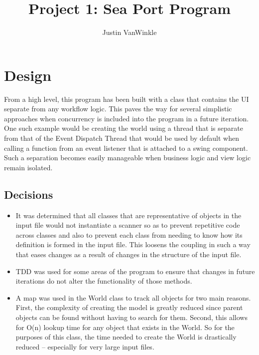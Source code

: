 \documentclass[english,floatsintext,man]{apa6}
\title{Project 1: Sea Port Program}
\author{Justin VanWinkle}
\affiliation{
    \vspace{0.5cm}
          \textsuperscript{} 26 March 2017\\
          \textsuperscript{} CMSC 335 (7980)  }
\providecommand{\tightlist}{%
  \setlength{\itemsep}{0pt}\setlength{\parskip}{0pt}}
\begin{document}
\maketitle

\setcounter{secnumdepth}{0}



\section{Design}\label{design}

From a high level, this program has been built with a class that
contains the UI separate from any workflow logic. This paves the way for
several simplistic approaches when concurrency is included into the
program in a future iteration. One such example would be creating the
world using a thread that is separate from that of the Event Dispatch
Thread that would be used by default when calling a function from an
event listener that is attached to a swing component. Such a separation
becomes easily manageable when business logic and view logic remain
isolated.

\subsection{Decisions}\label{decisions}

\begin{itemize}
\tightlist
\item
  It was determined that all classes that are representative of objects
  in the input file would not instantiate a scanner so as to prevent
  repetitive code across classes and also to prevent each class from
  needing to know how its definition is formed in the input file. This
  loosens the coupling in such a way that eases changes as a result of
  changes in the structure of the input file.
\item
  TDD was used for some areas of the program to ensure that changes in
  future iterations do not alter the functionality of those methods.
\item
  A map was used in the World class to track all objects for two main
  reasons. First, the complexity of creating the model is greatly
  reduced since parent objects can be found without having to search for
  them. Second, this allows for O(n) lookup time for any object that
  exists in the World. So for the purposes of this class, the time
  needed to create the World is drastically reduced -- especially for
  very large input files.
\end{itemize}
\end{document}
